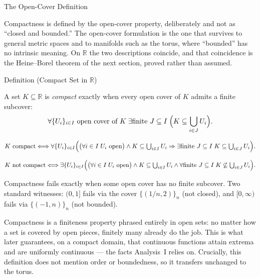 \label{sec:compactness-on-r}

\begin{topicbox}{The Open-Cover Definition}
\begin{exposition}
Compactness is defined by the open-cover property, deliberately and not as ``closed and bounded.'' The open-cover formulation is the one that survives to general metric spaces and to manifolds such as the torus, where ``bounded'' has no intrinsic meaning. On $\mathbb{R}$ the two descriptions coincide, and that coincidence is the Heine--Borel theorem of the next section, proved rather than assumed.
\end{exposition}
\end{topicbox}
\begin{definitionbox}{Definition (Compact Set in $\mathbb{R}$)}
\begin{definition}
\label{def:compact-set}
A set $K\subseteq\mathbb{R}$ is \emph{compact} exactly when every open cover of $K$ admits a finite subcover:
\[
\forall \{U_i\}_{i\in I}\text{ open cover of }K\;\exists \text{finite } J\subseteq I\;\Bigl(K\subseteq\bigcup_{i\in J}U_i\Bigr).
\]
\end{definition}
\end{definitionbox}
\begin{remark*}
\[
K \text{ compact} \Longleftrightarrow \forall \{U_i\}_{i\in I}\Bigl(\bigl(\forall i\in I\;U_i \text{ open}\bigr)\land K\subseteq\textstyle\bigcup_{i\in I}U_i \Rightarrow \exists \text{finite } J\subseteq I\;K\subseteq\textstyle\bigcup_{i\in J}U_i\Bigr).
\]
\end{remark*}
\begin{remark*}
\[
K \text{ not compact} \Longleftrightarrow \exists \{U_i\}_{i\in I}\Bigl(\bigl(\forall i\in I\;U_i \text{ open}\bigr)\land K\subseteq\textstyle\bigcup_{i\in I}U_i \land \forall \text{finite } J\subseteq I\;K\not\subseteq\textstyle\bigcup_{i\in J}U_i\Bigr).
\]
\end{remark*}
\begin{remark*}
Compactness fails exactly when some open cover has no finite subcover. Two standard witnesses: $(0,1]$ fails via the cover $\{(1/n,2)\}_{n}$ (not closed), and $[0,\infty)$ fails via $\{(-1,n)\}_{n}$ (not bounded).
\end{remark*}
\begin{remark*}[Interpretation]
Compactness is a finiteness property phrased entirely in open sets: no matter how a set is covered by open pieces, finitely many already do the job. This is what later guarantees, on a compact domain, that continuous functions attain extrema and are uniformly continuous --- the facts Analysis~I relies on. Crucially, this definition does not mention order or boundedness, so it transfers unchanged to the torus.
\end{remark*}
